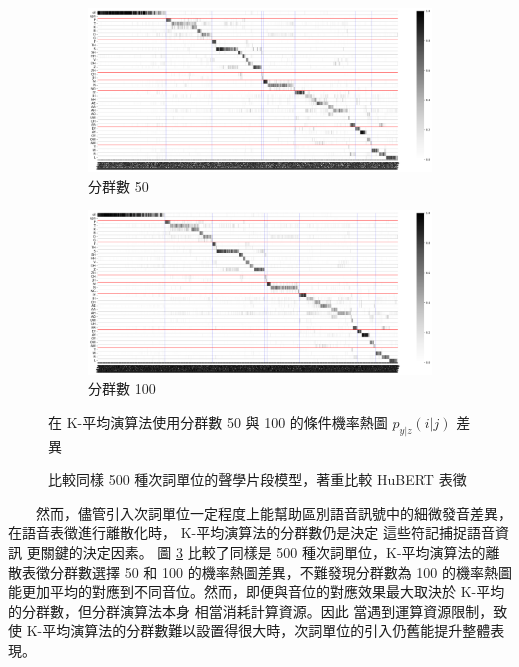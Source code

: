 {{
    {
        \begin{figure}
             \centering
             \begin{subfigure}{\textwidth}
                 \centering
                 \includegraphics[width=1\linewidth]{figures/ch4figs/hub-u050-ap0500-givenunit-byphn.png}
                 \caption{分群數 50}
                 \label{fig:hub-u050-ap0500-givenunit-byphn--picked}
             \end{subfigure}
             \vfill
             \begin{subfigure}{\textwidth}
                 \centering
                 \includegraphics[width=1\linewidth]{figures/ch4figs/hub-u050-ap1000-givenunit-byphn.png}
                 \caption{分群數 100}
                 \label{fig:hub-u100-ap0500-givenunit-byphn--picked}
             \end{subfigure}
             \caption{比較同樣 500 種次詞單位的聲學片段模型，著重比較 HuBERT 表徵}
             在 K-平均演算法使用分群數 50 與 100 的條件機率熱圖 $p_{y|z}(i|j)$ 差異
             \label{fig:check-ap0500}
        \end{figure}
    }
}

　　然而，儘管引入次詞單位一定程度上能幫助區別語音訊號中的細微發音差異，
在語音表徵進行離散化時，
K-平均演算法的分群數仍是決定
這些符記捕捉語音資訊
更關鍵的決定因素。
圖 \ref{fig:check-ap0500} 比較了同樣是 500 種次詞單位，K-平均演算法的離散表徵分群數選擇 50 和 100 的機率熱圖差異，不難發現分群數為 100 的機率熱圖能更加平均的對應到不同音位。然而，即便與音位的對應效果最大取決於 K-平均的分群數，但分群演算法本身
相當消耗計算資源。因此
當遇到運算資源限制，致使 K-平均演算法的分群數難以設置得很大時，次詞單位的引入仍舊能提升整體表現。

}
